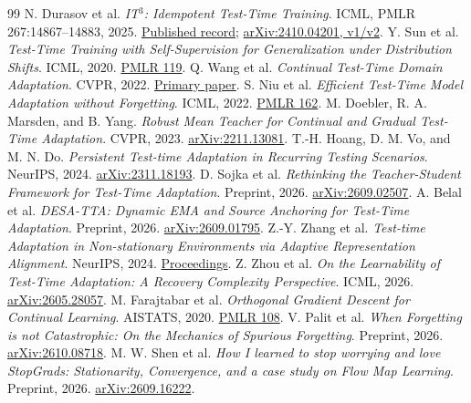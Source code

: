 \documentclass[11pt,a4paper]{article}
\begin{document}
\begin{thebibliography}{99}\small
{} N. Durasov et al. \emph{IT$^3$: Idempotent Test-Time Training}.
ICML, PMLR 267:14867--14883, 2025.
\href{https://proceedings.mlr.press/v267/durasov25a.html}{Published record};
\href{https://arxiv.org/abs/2410.04201}{arXiv:2410.04201, v1/v2}.
 Y. Sun et al. \emph{Test-Time Training with Self-Supervision
for Generalization under Distribution Shifts}. ICML, 2020.
\href{https://proceedings.mlr.press/v119/sun20b.html}{PMLR 119}.
 Q. Wang et al. \emph{Continual Test-Time Domain Adaptation}.
CVPR, 2022.
\href{https://openaccess.thecvf.com/content/CVPR2022/html/Wang_Continual_Test-Time_Domain_Adaptation_CVPR_2022_paper.html}{Primary paper}.
 S. Niu et al. \emph{Efficient Test-Time Model Adaptation
without Forgetting}. ICML, 2022.
\href{https://proceedings.mlr.press/v162/niu22a.html}{PMLR 162}.
 M. Doebler, R. A. Marsden, and B. Yang. \emph{Robust Mean
Teacher for Continual and Gradual Test-Time Adaptation}. CVPR, 2023.
\href{https://arxiv.org/abs/2211.13081}{arXiv:2211.13081}.
 T.-H. Hoang, D. M. Vo, and M. N. Do. \emph{Persistent
Test-time Adaptation in Recurring Testing Scenarios}. NeurIPS, 2024.
\href{https://arxiv.org/abs/2311.18193}{arXiv:2311.18193}.
 D. Sojka et al. \emph{Rethinking the Teacher-Student
Framework for Test-Time Adaptation}. Preprint, 2026.
\href{https://arxiv.org/abs/2609.02507}{arXiv:2609.02507}.
 A. Belal et al. \emph{DESA-TTA: Dynamic EMA and Source
Anchoring for Test-Time Adaptation}. Preprint, 2026.
\href{https://arxiv.org/abs/2609.01795}{arXiv:2609.01795}.
 Z.-Y. Zhang et al. \emph{Test-time Adaptation in
Non-stationary Environments via Adaptive Representation Alignment}.
NeurIPS, 2024.
\href{https://papers.neurips.cc/paper_files/paper/2024/hash/abe31a12e83111fdf2cfd54deed5a2ce-Abstract-Conference.html}{Proceedings}.
 Z. Zhou et al. \emph{On the Learnability of Test-Time
Adaptation: A Recovery Complexity Perspective}. ICML, 2026.
\href{https://arxiv.org/abs/2605.28057}{arXiv:2605.28057}.
 M. Farajtabar et al. \emph{Orthogonal Gradient Descent for
Continual Learning}. AISTATS, 2020.
\href{https://proceedings.mlr.press/v108/farajtabar20a.html}{PMLR 108}.
 V. Palit et al. \emph{When Forgetting is not Catastrophic:
On the Mechanics of Spurious Forgetting}. Preprint, 2026.
\href{https://arxiv.org/abs/2610.08718}{arXiv:2610.08718}.
 M. W. Shen et al. \emph{How I learned to stop worrying
and love StopGrads: Stationarity, Convergence, and a case study on Flow Map
Learning}. Preprint, 2026.
\href{https://arxiv.org/abs/2609.16222}{arXiv:2609.16222}.
\end{thebibliography}
\end{document}
